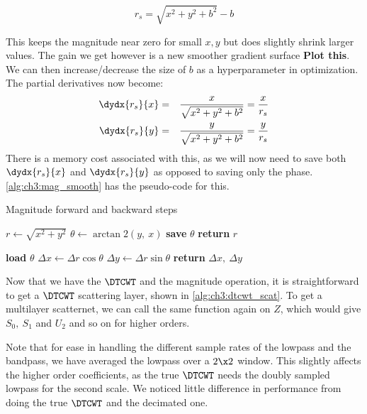 \begin{equation}\label{eq:ch3:magbias}
 r_s = \sqrt{x^2 + y^2 + b^2} - b
\end{equation}

This keeps the magnitude near zero for small $x,y$ but does slightly shrink larger
values. The gain we get however is a new smoother gradient surface \textbf{Plot
this}. We can then increase/decrease the size of $b$ as a hyperparameter in
optimization. The partial derivatives now become:
\begin{eqnarray}
  \dydx{r_s}{x} & = & \frac{x}{\sqrt{x^2 + y^2+b^2}} = \frac{x}{r_s}\\
  \dydx{r_s}{y} & = & \frac{y}{\sqrt{x^2 + y^2+b^2}} = \frac{y}{r_s} 
\end{eqnarray}
There is a memory cost associated with this, as we will now need to save both
$\dydx{r_s}{x}$ and $\dydx{r_s}{y}$ as opposed to saving only the phase.
\autoref{alg:ch3:mag_smooth} has the pseudo-code for this.

\begin{algorithm}[tb]
\caption{Magnitude forward and backward steps}\label{alg:ch3:mag}
\begin{algorithmic}[1]
  \State $r \gets \sqrt{x^2 + y^2}$
  \State $\theta \gets \arctan2(y,\ x)$ 
  \State \textbf{save} $\theta$ 
  \State \textbf{return} $r$
\EndFunction
\end{algorithmic}\vspace{10pt}
\begin{algorithmic}[1]
  \State \textbf{load} $\theta$
  \State $\Delta x \gets \Delta r \cos{\theta}$ 
  \State $\Delta y \gets \Delta r \sin{\theta}$ 
  \State \textbf{return} $\Delta x,\ \Delta y$
\EndFunction
\end{algorithmic}
\end{algorithm}

Now that we have the $\DTCWT$ and the magnitude operation, it is straightforward
to get a $\DTCWT$ scattering layer, shown in \autoref{alg:ch3:dtcwt_scat}. To
get a multilayer scatternet, we can call the same function again on $Z$, which
would give $S_0,\ S_1$ and $U_2$ and so on for higher orders. 

Note that for ease in handling the different sample rates of the lowpass and the
bandpass, we have averaged the lowpass over a $2\x 2$ window. This slightly
affects the higher order coefficients, as the true $\DTCWT$ needs the doubly
sampled lowpass for the second scale. We noticed little difference in
performance from doing the true $\DTCWT$ and the decimated one.

